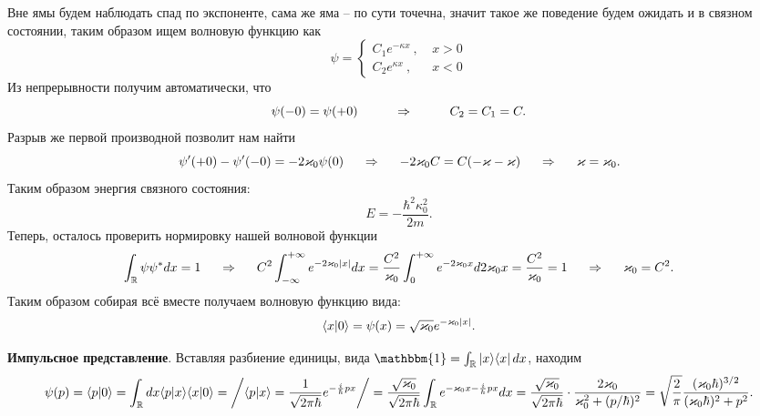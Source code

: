 Вне ямы будем наблюдать спад по экспоненте, сама же яма -- по сути точечна, значит такое же поведение будем ожидать и в связном состоянии, таким образом ищем волновую функцию как
\begin{equation*}
    \psi = \left\{\begin{aligned}
        C_1 e^{-\kappa x} \ , \ & x>0\\
        C_2 e^{\kappa x} \ , \ & x<0
    \end{aligned}\right.
\end{equation*}
Из непрерывности получим автоматически, что
\begin{equation*}
    \psi(-0) = \psi(+0)
    \hspace{1 cm}
    \Rightarrow
    \hspace{1 cm}
    C_2 = C_1 = C.
\end{equation*}
Разрыв же первой производной позволит нам найти
\begin{equation*}
    \psi'(+0) - \psi'(-0) = - 2 \kappa_0 \psi(0)
    \hspace{0.5 cm}
    \Rightarrow
    \hspace{0.5 cm}
    - 2 \kappa_0 C = C (-\kappa - \kappa)
    \hspace{0.5 cm}
    \Rightarrow
    \hspace{0.5 cm}
    \kappa = \kappa_0.
\end{equation*}
Таким образом  энергия связного состояния:
\begin{equation*}
    E = - \frac{\hbar^2 \kappa_0^2}{2 m}.
\end{equation*}
Теперь, осталось проверить нормировку нашей волновой функции
\begin{equation*}
    \int_{\mathbb{R}} \psi \psi^* d x = 1
    \hspace{0.5 cm}
    \Rightarrow
    \hspace{0.5 cm}
    C^2 \int_{-\infty}^{+\infty} e^{- 2 \kappa_0 |x|} d x = \frac{C^2}{\kappa_0} \int_{0}^{+\infty} e^{- 2 \kappa_0 x} d 2 \kappa_0 x
    = 
    \frac{C^2}{\kappa_0} = 1
    \hspace{0.5 cm}
    \Rightarrow
    \hspace{0.5 cm}
    \kappa_0 = C^2.
\end{equation*}
Таким образом собирая всё вместе получаем волновую функцию вида:
\begin{equation*}
    \bk{x}{0} = \psi(x) =  \sqrt{\kappa_0} e^{- \kappa_0|x|}.
\end{equation*}

\textbf{Импульсное представление}. Вставляя разбиение единицы, вида $\mathbbm{1} = \int_{\mathbb{R}} \kb{x}{x} \d x$, находим
\begin{equation*}
    \psi(p) = \bk{p}{0} = \int_\mathbb{R} d x \bk{p}{x} \bk{x}{0}
    =
    \bigg/
    \bk{p}{x} = \frac{1}{\sqrt{2 \pi \hbar}} e^{- \frac{i}{\hbar} p x
    }
    \bigg/  
    =
    \frac{\sqrt{\kappa_0}}{\sqrt{2 \pi \hbar}} \int_\mathbb{R} e^{- \kappa_0 x - \frac{i}{h}p x} d x
    =
    \frac{\sqrt{\kappa_0}}{\sqrt{2 \pi \hbar}} \cdot \frac{2 \kappa_0}{\kappa_0^2 + (p/\hbar)^2}
    = \sqrt{\frac{2}{\pi}} \frac{(\kappa_0 \hbar)^{3/2}}{(\kappa_0 \hbar)^2 + p^2}.
\end{equation*}
